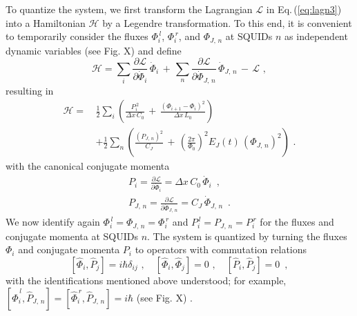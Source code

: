 To quantize the system, we first transform the Lagrangian $\mathcal{L}$ in Eq.\,(\ref{eq:lagn3})
into a Hamiltonian $\mathcal{H}$ by a Legendre transformation.
To this end, it is convenient to temporarily consider the fluxes $\Phi_i^{\,l}$, $\Phi_i^{\,r}$, and $\Phi_{J,\,n}$ 
at SQUIDs $n$ as independent dynamic variables 
\color{red} (see Fig. X) 
\color{blue}
and define 
%
\begin{equation} \label{eq:ham1}
\mathcal{H} = \sum_{i} \frac{\partial\mathcal{L}}{\partial\dot{\Phi}_i} \, \dot{\Phi}_i 
\, + \, \sum_{n} \frac{\partial\mathcal{L}}{\partial\dot{\Phi}_{J,\,n}} \, \dot{\Phi}_{J,\,n}
\, - \, \mathcal{L} \, \, , 
\end{equation}
%
resulting in
%
\begin{equation} \label{eq:ham2}
\begin{split}
\mathcal{H} = \, & \frac{1}{2} \sum_i \left( \frac{P_i^{\,2}}{\Delta x \, C_{0}} \, + \, 
\frac{\left(\Phi_{i+1} - \Phi_{i}\right)^{2}}{\Delta x \, L_{0}} \right)  \\[2mm]
& + \frac{1}{2} \sum_n \left( \frac{\left(P_{J,\,n}\right)^2}{C_{J}} \, + \, 
 \left(\frac{2 \pi}{\Phi_0} \right)^2 E_J(t) \, \left( \Phi_{J,\,n} \right)^2 
\right) \, \, .
\end{split}
\end{equation}
%
with the canonical conjugate momenta
%
\begin{subequations} \label{eq:mom}
\begin{eqnarray} 
P_i = \frac{\partial\mathcal{L}}{\partial\dot{\Phi}_i} = \Delta x \, C_0 \, \dot{\Phi}_i \label{eq:moma} \, \, \, , \\[2mm]
P_{J,\,n} = \frac{\partial\mathcal{L}}{\partial\dot{\Phi}_{J,\,n}} =  C_J \, \dot{\Phi}_{J,\,n} \, \, \,  . \label{eq:momb}
\end{eqnarray}
\end{subequations}
%
We now identify again $\Phi_i^{\,l} = \Phi_{J,\,n} = \Phi_i^{\,r}$ and $P_i^{\,l} = P_{J,\,n} = P_i^{\,r}$
for the fluxes and conjugate momenta at SQUIDs $n$.
The system is quantized by turning the fluxes $\Phi_i$ and conjugate momenta $P_i$ 
to operators with commutation relations
%
\begin{equation} \label{eq:cr} 
\left[\hat{\Phi}_i, \hat{P}_j \right] = i \hbar \delta_{ij} \, \, , \quad 
\left[\hat{\Phi}_i, \hat{\Phi}_j \right] = 0 \, \, , \quad 
\left[\hat{P}_i, \hat{P}_j \right] = 0 \, \, \, , 
\end{equation}
%
with the identifications mentioned above understood; for example, 
$\left[\hat{\Phi}_i^{\,l}, \hat{P}_{J,\,n} \right] = \left[\hat{\Phi}_i^{\,r}, \hat{P}_{J,\,n} \right] = i \hbar$
\color{red} (see Fig. X) 
\color{blue}.

